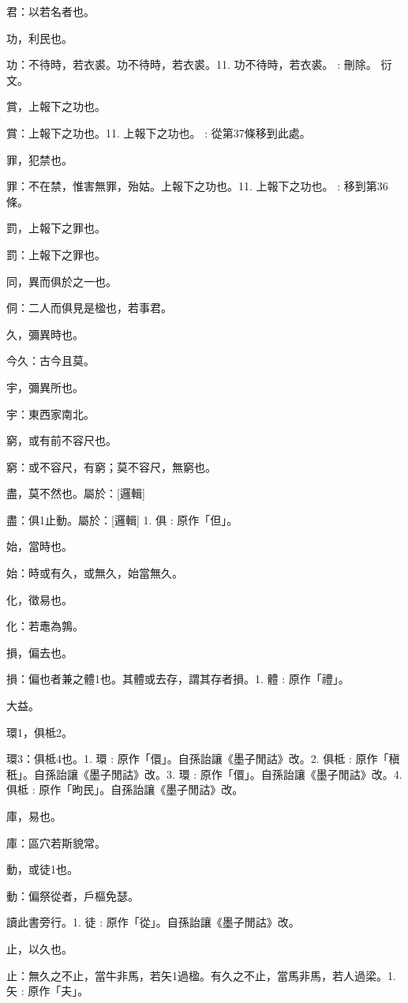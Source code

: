 \begin{pinyinscope}
君：以若名者也。

功，利民也。

功：不待時，若衣裘。功不待時，若衣裘。11. 功不待時，若衣裘。 : 刪除。 衍文。

賞，上報下之功也。

賞：上報下之功也。11. 上報下之功也。 : 從第37條移到此處。

罪，犯禁也。

罪：不在禁，惟害無罪，殆姑。上報下之功也。11. 上報下之功也。 : 移到第36條。

罰，上報下之罪也。

罰：上報下之罪也。

同，異而俱於之一也。

侗：二人而俱見是楹也，若事君。

久，彌異時也。

今久：古今且莫。

宇，彌異所也。

宇：東西家南北。

窮，或有前不容尺也。

窮：或不容尺，有窮；莫不容尺，無窮也。

盡，莫不然也。屬於：[邏輯]

盡：俱1止動。屬於：[邏輯] 
1. 俱 : 原作「但」。

始，當時也。

始：時或有久，或無久，始當無久。

化，徵易也。

化：若鼃為鶉。

損，偏去也。

損：偏也者兼之體1也。其體或去存，謂其存者損。1. 體 : 原作「禮」。

大益。



環1，俱柢2。

環3：俱柢4也。1. 環 : 原作「儇」。自孫詒讓《墨子閒詁》改。2. 俱柢 : 原作「稹秖」。自孫詒讓《墨子閒詁》改。3. 環 : 原作「儇」。自孫詒讓《墨子閒詁》改。4. 俱柢 : 原作「昫民」。自孫詒讓《墨子閒詁》改。

庫，易也。

庫：區穴若斯貌常。

動，或徒1也。

動：偏祭從者，戶樞免瑟。

讀此書旁行。1. 徒 : 原作「從」。自孫詒讓《墨子閒詁》改。

止，以久也。

止：無久之不止，當牛非馬，若矢1過楹。有久之不止，當馬非馬，若人過梁。1. 矢 : 原作「夫」。


\end{pinyinscope}
